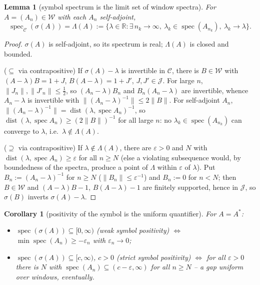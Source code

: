 \documentclass[11pt,reqno]{amsart}
\newtheorem{lemma}[theorem]{Lemma}
\newtheorem{corollary}[theorem]{Corollary}
\theoremstyle{definition}
\newcommand{\W}{\mathcal{W}}
\newcommand{\Jc}{\mathcal{J}}
\newcommand{\Cor}{\mathcal{C}}
\newcommand{\spec}{\operatorname{spec}}
\newcommand{\dist}{\operatorname{dist}}
\newcommand{\R}{\mathbb{R}}
\newcommand{\half}{\tfrac12}
\begin{document}
\begin{lemma}[symbol spectrum is the limit set of window spectra]
\label{lem:symbol-spectrum}
For \(A=(A_n)\in\W\) with each \(A_n\) self-adjoint,
\[
\spec_{\Cor}(\sigma(A))=\Lambda(A):=\bigl\{\lambda\in\R:\exists\,n_k\to\infty,\
\lambda_k\in\spec(A_{n_k}),\ \lambda_k\to\lambda\bigr\}.
\]
\end{lemma}

\begin{proof}
\(\sigma(A)\) is self-adjoint, so its spectrum is real; \(\Lambda(A)\) is closed
and bounded.

(\(\subseteq\) via contrapositive) If \(\sigma(A)-\lambda\) is invertible in
\(\Cor\), there is \(B\in\W\) with \((A-\lambda)B=1+J\), \(B(A-\lambda)=1+J'\),
\(J,J'\in\Jc\). For large \(n\), \(\|J_n\|,\|J'_n\|\leq\half\), so
\((A_n-\lambda)B_n\) and \(B_n(A_n-\lambda)\) are invertible, whence
\(A_n-\lambda\) is invertible with \(\|(A_n-\lambda)^{-1}\|\leq2\|B\|\). For
self-adjoint \(A_n\),
\(\|(A_n-\lambda)^{-1}\|=\dist(\lambda,\spec A_n)^{-1}\), so
\(\dist(\lambda,\spec A_n)\geq(2\|B\|)^{-1}\) for all large \(n\): no
\(\lambda_k\in\spec(A_{n_k})\) can converge to \(\lambda\), i.e.\
\(\lambda\notin\Lambda(A)\).

(\(\supseteq\) via contrapositive) If \(\lambda\notin\Lambda(A)\), there are
\(\varepsilon>0\) and \(N\) with \(\dist(\lambda,\spec A_n)\geq\varepsilon\) for
all \(n\geq N\) (else a violating subsequence would, by boundedness of the
spectra, produce a point of \(\Lambda\) within \(\varepsilon\) of \(\lambda\)).
Put \(B_n:=(A_n-\lambda)^{-1}\) for \(n\geq N\) (\(\|B_n\|\leq\varepsilon^{-1}\))
and \(B_n:=0\) for \(n<N\); then \(B\in\W\) and \((A-\lambda)B-1\),
\(B(A-\lambda)-1\) are finitely supported, hence in \(\Jc\), so \(\sigma(B)\)
inverts \(\sigma(A)-\lambda\).
\end{proof}

\begin{corollary}[positivity of the symbol is the uniform quantifier]
\label{cor:master-quantifier}
For \(A=A^*\):
\begin{itemize}
\item \(\spec(\sigma(A))\subseteq[0,\infty)\) \emph{(weak symbol positivity)}
\(\iff\) \(\min\spec(A_n)\geq-\varepsilon_n\) with \(\varepsilon_n\to0\);
\item \(\spec(\sigma(A))\subseteq[c,\infty)\), \(c>0\) \emph{(strict symbol
positivity)} \(\iff\) for all \(\varepsilon>0\) there is \(N\) with
\(\spec(A_n)\subseteq(c-\varepsilon,\infty)\) for all \(n\geq N\) -- a gap
\emph{uniform over windows, eventually}.
\end{itemize}
\end{corollary}
\end{document}

